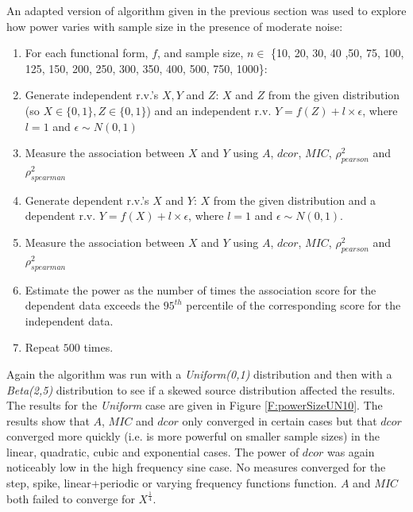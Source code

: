 \documentclass[a4paper, 12pt]{report}
\begin{document}
An adapted version of algorithm given in the previous section was used to explore how power varies with sample size in the presence of moderate noise:

\begin{enumerate}
\item For each functional form, $f$, and sample size, $n\in$ \{10, 20, 30, 40 ,50, 75, 100, 125, 150, 200, 250, 300, 350, 400, 500, 750, 1000\}:
\item Generate independent r.v.'s $X,Y$ and $Z$: $X$ and $Z$ from the given distribution (so $X \in \{0,1\}, Z \in \{0,1\}$) and an independent r.v. $Y=f(Z) + l \times \epsilon$, where $l=1$ and $\epsilon \sim N(0,1)$
\item  Measure the association between $X$ and $Y$ using $A$, $dcor$, $MIC$, $\rho_{pearson}^2$ and $\rho_{spearman}^2$
\item Generate dependent r.v.'s $X$ and $Y$: $X$ from the given distribution and a dependent r.v. $Y=f(X) + l \times \epsilon$, where $l=1$ and $\epsilon \sim N(0,1)$. 
\item  Measure the association between $X$ and $Y$ using $A$, $dcor$, $MIC$, $\rho_{pearson}^2$ and $\rho_{spearman}^2$
\item Estimate the power as the number of times the association score for the dependent data exceeds the $95^{th}$ percentile of the corresponding score for the independent data.
\item Repeat $500$ times.
\end{enumerate}

Again the algorithm was run with a \textit{Uniform(0,1)} distribution and then with a \textit{Beta(2,5)} distribution to see if a skewed source distribution affected the results. The results for the \textit{Uniform} case are given in Figure \ref{F:powerSizeUN10}. The results show that $A$, $MIC$ and $dcor$ only converged in certain cases but that $dcor$ converged more quickly (i.e. is more powerful on smaller sample sizes) in the linear, quadratic, cubic and exponential cases. The power of $dcor$ was again noticeably low in the high frequency sine case. No measures converged for the step, spike, linear+periodic or varying frequency functions function. $A$ and $MIC$ both failed to converge for $X^{\frac{1}{4}}$.
\end{document}
